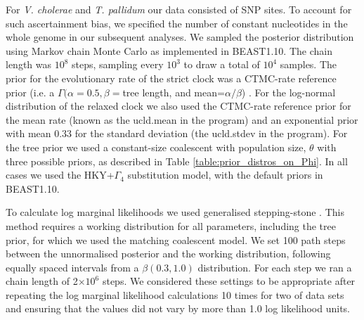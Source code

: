 \documentclass[10pt,letterpaper]{article}
\begin{document}
For \textit{V. cholerae} and \textit{T. pallidum} our data consisted of SNP sites. To account for such ascertainment bias, we specified the number of constant nucleotides in the whole genome in our subsequent analyses. We sampled the posterior distribution using Markov chain Monte Carlo as implemented in BEAST1.10. The chain length was $10^8$ steps, sampling every $10^3$ to draw a total of $10^4$ samples. The prior for the evolutionary rate of the strict clock was a CTMC-rate reference prior (i.e. a $\Gamma(\alpha=0.5, \beta=$tree length, and mean=$\alpha/\beta$) \cite{ferreira2008bayesian}. For the log-normal distribution of the relaxed clock we also used the CTMC-rate reference prior for the mean rate (known as the ucld.mean in the program) and an exponential prior with mean 0.33 for the standard deviation (the ucld.stdev in the program). For the tree prior we used a constant-size coalescent with population size, $\theta$ with three possible priors, as described in Table \ref{table:prior_distros_on_Phi}. In all cases we used the HKY+$\Gamma_4$ substitution model, with the default priors in BEAST1.10.

To calculate log marginal likelihoods we used generalised stepping-stone \cite{baele2016genealogical,fan2011choosing}. This method requires a working distribution for all parameters, including the tree prior, for which we used the matching coalescent model. We set 100 path steps between the unnormalised posterior and the working distribution, following equally spaced intervals from a $\beta(0.3, 1.0)$ distribution. For each step we ran a chain length of 2$\times 10^{6}$ steps. We considered these settings to be appropriate after repeating the log marginal likelihood calculations 10 times for two of data sets and ensuring that the values did not vary by more than 1.0 log likelihood units.
\end{document}
